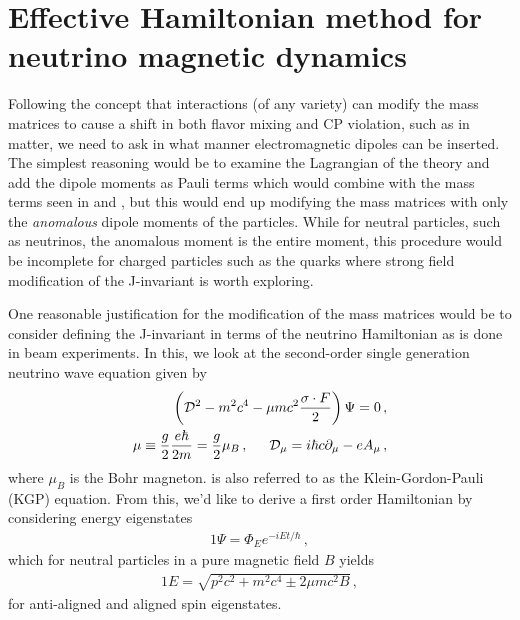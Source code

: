 \section{Effective Hamiltonian method for neutrino magnetic dynamics}\label{sec:effective}
\noindent Following the concept that interactions (of any variety) can modify the mass matrices to cause a shift in both flavor mixing and CP violation, such as in matter, we need to ask in what manner electromagnetic dipoles can be inserted. The simplest reasoning would be to examine the Lagrangian of the theory and add the dipole moments as Pauli terms \ar which would combine with the mass terms seen in  and , but this would end up modifying the mass matrices with only the \emph{anomalous} dipole moments of the particles. While for neutral particles, such as neutrinos, the anomalous moment is the entire moment, this procedure would be incomplete for charged particles such as the quarks where strong field modification of the J-invariant is worth exploring.

One reasonable justification for the modification of the mass matrices would be to consider defining the J-invariant in terms of the neutrino Hamiltonian as is done in beam experiments. In this, we look at the second-order single generation neutrino wave equation given by 
\begin{alignat}{1}
	\label{nkgp:1} \left(\mathcal{D}^{2}-m^{2}c^{4}-\mu mc^{2}\frac{\sigma\cdot F}{2}\right)\Psi=0\,,\\
	\label{nkgp:2} \mu\equiv\frac{g}{2}\frac{e\hbar}{2m}=\frac{g}{2}\mu_{B}\,,\indent \mathcal{D}_{\mu}=i\hbar c\partial_{\mu}-eA_{\mu}\,,
\end{alignat}
where $\mu_{B}$ is the Bohr magneton.  is also referred to as the Klein-Gordon-Pauli (KGP) equation. \ar From this, we'd like to derive a first order Hamiltonian by considering energy eigenstates
\begin{alignat}{1}
	\label{eigen:1} \Psi = \Phi_{E}e^{-iEt/\hbar}\,,
\end{alignat}
which for neutral particles in a pure magnetic field $B$ yields
\begin{alignat}{1}
	\label{eigen:2} E = \sqrt{p^{2}c^{2}+m^{2}c^{4}\pm2\mu mc^{2}B}\,,
\end{alignat}
for anti-aligned and aligned spin eigenstates.

